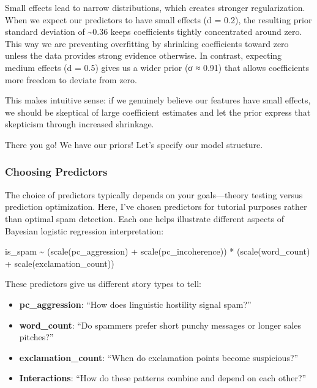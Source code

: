 \documentclass[
  letterpaper,
  DIV=11,
  numbers=noendperiod]{scrartcl}
\newenvironment{Shaded}{\begin{snugshade}}{\end{snugshade}}
\newcommand{\FunctionTok}[1]{\textcolor[rgb]{0.28,0.35,0.67}{#1}}
\newcommand{\NormalTok}[1]{\textcolor[rgb]{0.00,0.23,0.31}{#1}}
\newcommand{\SpecialCharTok}[1]{\textcolor[rgb]{0.37,0.37,0.37}{#1}}
\begin{document}
Small effects lead to narrow distributions, which creates stronger
regularization. When we expect our predictors to have small effects (d =
0.2), the resulting prior standard deviation of \textasciitilde0.36
keeps coefficients tightly concentrated around zero. This way we are
preventing overfitting by shrinking coefficients toward zero unless the
data provides strong evidence otherwise. In contrast, expecting medium
effects (d = 0.5) gives us a wider prior (σ ≈ 0.91) that allows
coefficients more freedom to deviate from zero.

This makes intuitive sense: if we genuinely believe our features have
small effects, we should be skeptical of large coefficient estimates and
let the prior express that skepticism through increased shrinkage.

There you go! We have our priors! Let's specify our model structure.

\subsubsection{Choosing Predictors}\label{choosing-predictors}

The choice of predictors typically depends on your goals---theory
testing versus prediction optimization. Here, I've chosen predictors for
tutorial purposes rather than optimal spam detection. Each one helps
illustrate different aspects of Bayesian logistic regression
interpretation:

\begin{Shaded}
\begin{Highlighting}[]
\NormalTok{  is\_spam }\SpecialCharTok{\textasciitilde{}}\NormalTok{ (}\FunctionTok{scale}\NormalTok{(pc\_aggression) }\SpecialCharTok{+} \FunctionTok{scale}\NormalTok{(pc\_incoherence)) }\SpecialCharTok{*} 
\NormalTok{    (}\FunctionTok{scale}\NormalTok{(word\_count) }\SpecialCharTok{+} \FunctionTok{scale}\NormalTok{(exclamation\_count))}
\end{Highlighting}
\end{Shaded}

These predictors give us different story types to tell:

\begin{itemize}
\item
  \textbf{pc\_aggression}: ``How does linguistic hostility signal
  spam?''
\item
  \textbf{word\_count}: ``Do spammers prefer short punchy messages or
  longer sales pitches?''
\item
  \textbf{exclamation\_count}: ``When do exclamation points become
  suspicious?''
\item
  \textbf{Interactions}: ``How do these patterns combine and depend on
  each other?''
\end{itemize}
\end{document}
